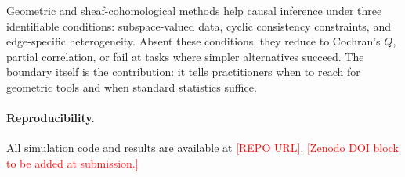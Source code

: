 \documentclass[11pt]{article}
\begin{document}
Geometric and sheaf-cohomological methods help causal inference under three identifiable conditions: subspace-valued data, cyclic consistency constraints, and edge-specific heterogeneity.
Absent these conditions, they reduce to Cochran's $Q$, partial correlation, or fail at tasks where simpler alternatives succeed.
The boundary itself is the contribution: it tells practitioners when to reach for geometric tools and when standard statistics suffice.

\paragraph{Reproducibility.}
All simulation code and results are available at \textcolor{red}{[REPO URL]}. \textcolor{red}{[Zenodo DOI block to be added at submission.]}


% 
\end{document}
